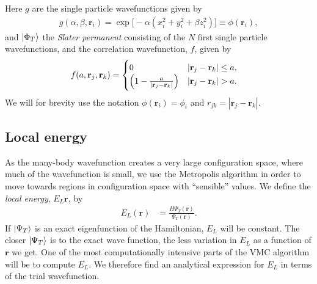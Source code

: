 \documentclass[
    a4paper, aps, twocolumn, floatfix, superscriptaddress]{revtex4-1}
\newcommand{\vf}{\mathbf}
\newcommand{\1}{\mathds{1}}
\begin{document}
    Here $g$ are the single particle wavefunctions given by
    \begin{align}
        g(\alpha, \beta, \vf{r}_i)
        = \exp\bigl[
            -\alpha(x_i^2 + y_i^2 + \beta z_i^2)
        \bigr] \equiv \phi(\vf{r}_i),
    \end{align}
    and $\ket{\Phi_T}$ the \textit{Slater permanent} consisting of the $N$ first
    single particle wavefunctions, and the correlation wavefunction, $f$, given
    by
    \begin{align}
        f(a, \vf{r}_j, \vf{r}_k)
        &=
        \begin{cases}
            0 & |\vf{r}_j - \vf{r}_k| \leq a, \\
            \Bigl(
                1 - \frac{a}{|\vf{r}_j - \vf{r}_k|}
            \Bigr) & |\vf{r}_j - \vf{r}_k| > a.
        \end{cases}
    \end{align}
    We will for brevity use the notation $\phi(\vf{r}_i) = \phi_i$ and $r_{jk} =
    |\vf{r}_j - \vf{r}_k|$.

    \subsection{Local energy}
        As the many-body wavefunction creates a very large configuration space,
        where much of the wavefunction is small, we use the Metropolis algorithm
        in order to move towards regions in configuration space with
        ``sensible'' values. We define the \textit{local energy}, $E_L{\vf{r}}$,
        by
        \begin{align}
            E_L(\vf{r})
            &= \frac{H\Psi_T(\vf{r})}{\Psi_T(\vf{r})}.
        \end{align}
        If $\ket{\Psi_T}$ is an exact eigenfunction of the Hamiltonian, $E_L$
        will be constant. The closer $\ket{\Psi_T}$ is to the exact wave
        function, the less variation in $E_L$ as a function of $\vf{r}$ we get.
        One of the most computationally intensive parts of the VMC algorithm
        will be to compute $E_L$. We therefore find an analytical expression for
        $E_L$ in terms of the trial wavefunction.
\end{document}
